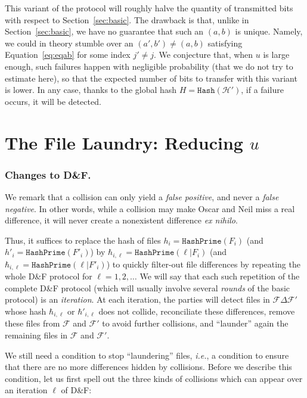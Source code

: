 \documentclass[twoside,envcountsame,runningheads]{llncs}
\newcommand{\Set}{\mathcal{H}}
\newcommand{\Files}{\mathcal{F}}
\newcommand{\df}{D\&F\xspace}
\newcommand{\ie}{\textit{i.e.}\xspace}
\newcommand{\eg}{\textit{e.g.}\xspace}
\newcommand{\Hash}{\ensuremath{\mathtt{Hash}}}
\newcommand{\HashPrime}{\ensuremath{\mathtt{HashPrime}}}
\begin{document}
This variant of the protocol will roughly halve the quantity of transmitted bits with respect to Section~\ref{sec:basic}.
The drawback is that, unlike in Section~\ref{sec:basic}, we have no guarantee that such an $(a,b)$ is unique. Namely, we could in theory stumble over an $(a',b')\neq (a,b)$ satisfying Equation~\eqref{eq:eqab} for some index $j' \neq j$. We conjecture that, when $u$ is large enough, such failures happen with negligible probability (that we do not try to estimate here), so that the expected number of bits to transfer with this variant is lower.
In any case, thanks to the global hash $H = \Hash(\Set')$, if a failure occurs, it will be detected.


\section{The File Laundry: Reducing $u$}
\label{ap:shortu}

\subsubsection{Changes to \df.}

We remark that a collision can only yield a \textit{false positive}, and never a \textit{false negative}. In other words, while a collision may make Oscar and Neil miss a real difference,
it will never create a nonexistent difference \textit{ex nihilo}.

Thus, it suffices to replace the hash of files $h_i = \HashPrime(F_i)$ (and $h'_i = \HashPrime(F'_i)$) by $\hbar_{i,\ell}=\HashPrime(\ell|F_i)$ (and $\hbar_{i,\ell} = \HashPrime(\ell|F'_i)$) to quickly filter-out file differences by repeating the whole \df protocol for $\ell=1,2,\ldots$ We will say that each such repetition of the complete \df protocol (which will usually involve several \emph{rounds} of the basic protocol) is an \emph{iteration}.
At each iteration, the parties will detect files in $\Files \Delta \Files'$ whose hash $\hbar_{i,\ell}$ or $\hbar'_{i,\ell}$ does not collide, reconciliate these differences, remove these files from $\Files$ and $\Files'$ to avoid further collisions, and ``launder'' again the remaining files in $\Files$ and $\Files'$.

We still need a condition to stop ``laundering'' files, \ie, a condition to ensure that there are no more differences hidden by collisions.
Before we describe this condition, let us first spell out the three kinds of collisions which can appear over an iteration $\ell$ of \df:
\end{document}
